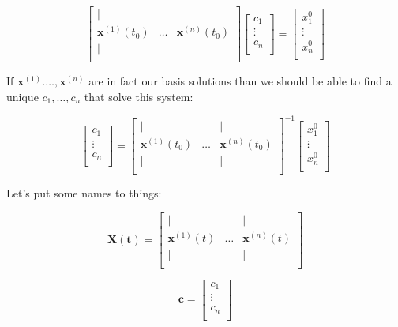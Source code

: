 \documentclass{report}
\begin{document}
$$
\begin{bmatrix}
    \vert & & \vert \\
    \mathbf{x}^{(1)}(t_0) & \dots & \mathbf{x}^{(n)}(t_0) \\
    \vert & & \vert \\
\end{bmatrix}
\begin{bmatrix}
    c_1 \\
    \vdots \\
    c_n \\
\end{bmatrix}
=
\begin{bmatrix}
    x_1^0 \\
    \vdots \\
    x_n^0 \\
\end{bmatrix}
$$

If $\mathbf{x}^{(1)}. \dots, \mathbf{x}^{(n)}$ are in fact our basis solutions than we should be able to find a unique $c_1, \dots, c_n$ that solve this system:

$$
\begin{bmatrix}
    c_1 \\
    \vdots \\
    c_n \\
\end{bmatrix}
=
\begin{bmatrix}
    \vert & & \vert \\
    \mathbf{x}^{(1)}(t_0) & \dots & \mathbf{x}^{(n)}(t_0) \\
    \vert & & \vert \\
\end{bmatrix}^{-1}
\begin{bmatrix}
    x_1^0 \\
    \vdots \\
    x_n^0 \\
\end{bmatrix}
$$


Let's put some names to things:

$$\mathbf{X(t)} = 
\begin{bmatrix}
    \vert & & \vert \\
    \mathbf{x}^{(1)}(t) & \dots & \mathbf{x}^{(n)}(t) \\
    \vert & & \vert \\
\end{bmatrix}
$$

$$
\mathbf{c} = 
\begin{bmatrix}
    c_1 \\
    \vdots \\
    c_n \\
\end{bmatrix}
$$
\end{document}
